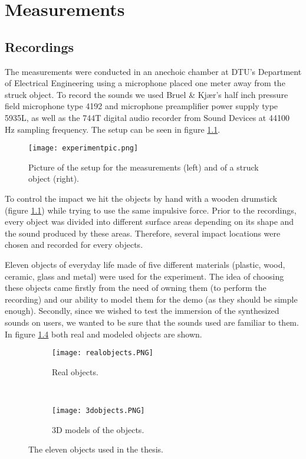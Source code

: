 \chapter{Measurements}\label{ch:measurements}

\section{Recordings}\label{sec:recordings}

The measurements were conducted in an anechoic chamber at DTU's Department of Electrical Engineering using a microphone placed one meter away from the struck object. To record the sounds we used Bruel \& Kjær's half inch pressure field microphone type 4192 and microphone preamplifier power supply type 5935L, as well as the 744T digital audio recorder from Sound Devices at 44100 Hz sampling frequency. The setup can be seen in figure \ref{fig:experiment}.

\begin{figure}[H]
  \centering
    \texttt{[image: experimentpic.png]}
      \caption{Picture of the setup for the measurements (left) and of a struck object (right).}\label{fig:experiment}
\end{figure}

To control the impact we hit the objects by hand with a wooden drumstick (figure \ref{fig:experiment}) while trying to use the same impulsive force. Prior to the recordings, every object was divided into different surface areas depending on its shape and the sound produced by these areas. Therefore, several impact locations were chosen and recorded for every objects.

Eleven objects of everyday life made of five different materials (plastic, wood, ceramic, glass and metal) were used for the experiment. The idea of choosing these objects came firstly from the need of owning them (to perform the recording) and our ability to model them for the demo (as they should be simple enough). Secondly, since we wished to test the immersion of the synthesized sounds on users, we wanted to be sure that the sounds used are familiar to them. In figure \ref{fig:objects} both real and modeled objects are shown. 

\begin{figure}[H]
    \centering
    \begin{subfigure}[b]{0.7\textwidth}
        \texttt{[image: realobjects.PNG]}
        \caption{Real objects.}
        \label{fig:gull}
    \end{subfigure}
    ~ %
    \begin{subfigure}[b]{0.7\textwidth}
        \texttt{[image: 3dobjects.PNG]}
        \caption{3D models of the objects.}
        \label{fig:tiger}
    \end{subfigure}
    \caption{The eleven objects used in the thesis.}\label{fig:objects}
\end{figure}

